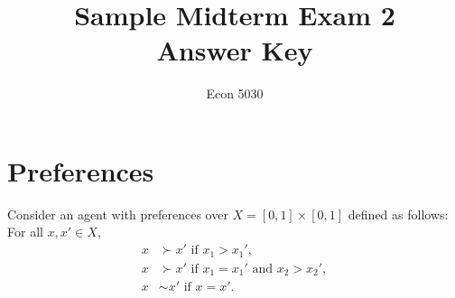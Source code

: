 \title{Sample Midterm Exam 2\ifsol\\[4pt]\large Answer Key\fi}
\author{Econ 5030}
\date{}


\maketitle
\thispagestyle{myheadings}

\section{Preferences}

\noindent Consider an agent with preferences over $X=[0,1]\times[0,1]$ defined as follows: For all $x,x'\in X$,
\begin{align*}
x &\succ x' \text{ if } x_1 > x_1',\\
x &\succ x' \text{ if } x_1 = x_1' \text{ and } x_2 > x_2',\\
x &\sim x' \text{ if } x = x'.
\end{align*}

